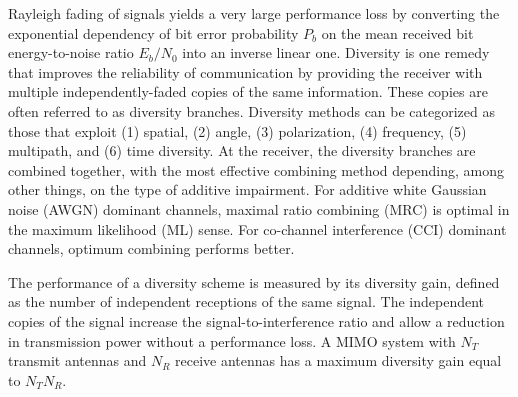 


Rayleigh fading of signals yields a very large performance loss by converting the exponential dependency of bit error probability $P_b$ on the mean received bit energy-to-noise ratio $E_b/N_0$ into an inverse linear one. Diversity is one remedy that improves the reliability of communication by providing the receiver with multiple independently-faded copies of the same information. These copies are often referred to as diversity branches. Diversity methods can be categorized as those that exploit (1) spatial, (2) angle, (3) polarization, (4) frequency, (5) multipath, and (6) time diversity. At the receiver, the diversity branches are combined together, with the most effective combining method depending, among other things, on the type of additive impairment. For additive white Gaussian noise (AWGN) dominant channels, maximal ratio combining (MRC) is optimal in the maximum likelihood (ML) sense. For co-channel interference (CCI) dominant channels, optimum combining performs better.

The performance of a diversity scheme is measured by its diversity gain, defined as the number of independent receptions of the same signal. The independent copies of the signal increase the signal-to-interference ratio and allow a reduction in transmission power without a performance loss. A MIMO system with $N_T$ transmit antennas and $N_R$ receive antennas has a maximum diversity gain equal to $N_TN_R$.
